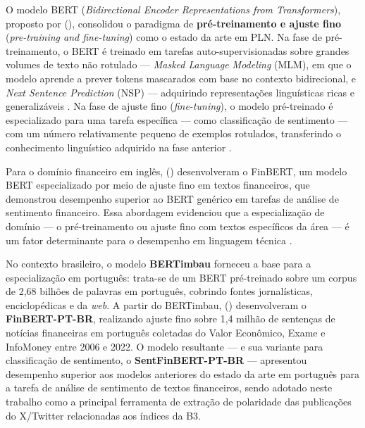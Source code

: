O modelo BERT (\textit{Bidirectional Encoder Representations from Transformers}), proposto por \citeauthor{devlin2019} (\citeyear{devlin2019}), consolidou o paradigma de \textbf{pré-treinamento e ajuste fino} (\textit{pre-training and fine-tuning}) como o estado da arte em PLN. Na fase de pré-treinamento, o BERT é treinado em tarefas auto-supervisionadas sobre grandes volumes de texto não rotulado --- \textit{Masked Language Modeling} (MLM), em que o modelo aprende a prever tokens mascarados com base no contexto bidirecional, e \textit{Next Sentence Prediction} (NSP) --- adquirindo representações linguísticas ricas e generalizáveis \cite{jurafsky2026}. Na fase de ajuste fino (\textit{fine-tuning}), o modelo pré-treinado é especializado para uma tarefa específica --- como classificação de sentimento --- com um número relativamente pequeno de exemplos rotulados, transferindo o conhecimento linguístico adquirido na fase anterior \cite{santos2023finbert}.

Para o domínio financeiro em inglês, \citeauthor{araci2019} (\citeyear{araci2019}) desenvolveram o FinBERT, um modelo BERT especializado por meio de ajuste fino em textos financeiros, que demonstrou desempenho superior ao BERT genérico em tarefas de análise de sentimento financeiro. Essa abordagem evidenciou que a especialização de domínio --- o pré-treinamento ou ajuste fino com textos específicos da área --- é um fator determinante para o desempenho em linguagem técnica \cite{araci2019,santos2023finbert}.

No contexto brasileiro, o modelo \textbf{BERTimbau} \cite{souza2020} forneceu a base para a especialização em português: trata-se de um BERT pré-treinado sobre um corpus de 2,68 bilhões de palavras em português, cobrindo fontes jornalísticas, enciclopédicas e da \textit{web}. A partir do BERTimbau, \citeauthor{santos2023finbert} (\citeyear{santos2023finbert}) desenvolveram o \textbf{FinBERT-PT-BR}, realizando ajuste fino sobre 1,4 milhão de sentenças de notícias financeiras em português coletadas do Valor Econômico, Exame e InfoMoney entre 2006 e 2022. O modelo resultante --- e sua variante para classificação de sentimento, o \textbf{SentFinBERT-PT-BR} --- apresentou desempenho superior aos modelos anteriores do estado da arte em português para a tarefa de análise de sentimento de textos financeiros, sendo adotado neste trabalho como a principal ferramenta de extração de polaridade das publicações do X/Twitter relacionadas aos índices da B3.

